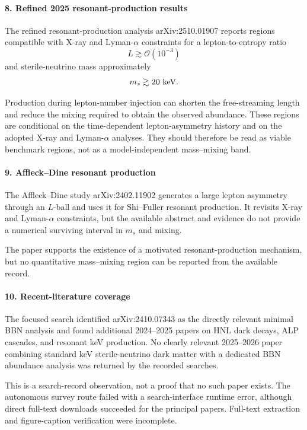\documentclass[11pt,a4paper]{article}
\begin{document}
\paragraph{8. Refined 2025 resonant-production results}
The refined resonant-production analysis arXiv:2510.01907 reports regions compatible with X-ray and Lyman-\(\alpha\) constraints for a lepton-to-entropy ratio \[ L\gtrsim \mathcal{O}(10^{-3}) \] and sterile-neutrino mass approximately \[ m_s\gtrsim 20\ {\rm keV}. \]

Production during lepton-number injection can shorten the free-streaming length and reduce the mixing required to obtain the observed abundance. These regions are conditional on the time-dependent lepton-asymmetry history and on the adopted X-ray and Lyman-\(\alpha\) analyses. They should therefore be read as viable benchmark regions, not as a model-independent mass--mixing band.

\paragraph{9. Affleck--Dine resonant production}
The Affleck--Dine study arXiv:2402.11902 generates a large lepton asymmetry through an \(L\)-ball and uses it for Shi--Fuller resonant production. It revisits X-ray and Lyman-\(\alpha\) constraints, but the available abstract and evidence do not provide a numerical surviving interval in \(m_s\) and mixing.

The paper supports the existence of a motivated resonant-production mechanism, but no quantitative mass--mixing region can be reported from the available record.

\paragraph{10. Recent-literature coverage}
The focused search identified arXiv:2410.07343 as the directly relevant minimal BBN analysis and found additional 2024--2025 papers on HNL dark decays, ALP cascades, and resonant keV production. No clearly relevant 2025--2026 paper combining standard keV sterile-neutrino dark matter with a dedicated BBN abundance analysis was returned by the recorded searches.

This is a search-record observation, not a proof that no such paper exists. The autonomous survey route failed with a search-interface runtime error, although direct full-text downloads succeeded for the principal papers. Full-text extraction and figure-caption verification were incomplete.
\end{document}

